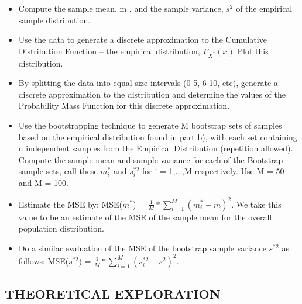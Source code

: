 \documentclass[11pt]{article}
\providecommand{\tightlist}{%
      \setlength{\itemsep}{0pt}\setlength{\parskip}{0pt}}
\begin{document}
\begin{itemize}
\tightlist
\item
  Compute the sample mean, m , and the sample variance, \(s^2\) of the
  empirical sample distribution.
\item
  Use the data to generate a discrete approximation to the Cumulative
  Distribution Function -- the empirical distribution, \(F_{X^*}(x)\)
  Plot this distribution.
\item
  By splitting the data into equal size intervals (0-5, 6-10, etc),
  generate a discrete approximation to the distribution and determine
  the values of the Probability Mass Function for this discrete
  approximation.
\item
  Use the bootstrapping technique to generate M bootstrap sets of
  samples based on the empirical distribution found in part b), with
  each set containing n independent samples from the Empirical
  Distribution (repetition allowed). Compute the sample mean and sample
  variance for each of the Bootstrap sample sets, call these \(m_{i}^*\)
  and \(s_{i}^{*2}\) for i = 1,...,M respectively. Use M = 50 and M =
  100.
\item
  Estimate the MSE by: MSE(\(m^*\)) =
  \(\frac{1}{M} * \sum_{i=1}^{M} (m_{i}^* - m)^2\). We take this value
  to be an estimate of the MSE of the sample mean for the overall
  population distribution.
\item
  Do a similar evaluation of the MSE of the bootstrap sample variance
  \(s^{*2}\) as follows: MSE(\(s^{*2}\)) =
  \(\frac{1}{M} * \sum_{i=1}^{M} (s_{i}^{*2} - s^2)^2\).
\end{itemize}

    \subsection{THEORETICAL EXPLORATION}\label{theoretical-exploration}
\end{document}
